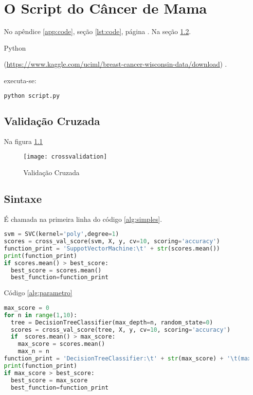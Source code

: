 \chapter{O Script do Câncer de Mama}
\label{chapter:o_script_do_cancer_de_mama}


No apêndice \ref{app:code}, seção
\ref{lst:code}, página \pageref{lst:code}.
Na seção \ref{sintaxe}.

Python \cite{PYTHON} 
  
(\url{https://www.kaggle.com/uciml/breast-cancer-wisconsin-data/download}) \cite{BREASTCANCER}.

executa-se:

\begin{lstlisting}[language=Python, caption=Executar Script.py]
python script.py
\end{lstlisting}

\section{Validação Cruzada}

Na figura \ref{fig:crossvalidation}

\begin{figure}[H]
\begin{center}
\caption{Validação Cruzada}
\texttt{[image: crossvalidation]}
\label{fig:crossvalidation}
\end{center}
\end{figure}

\section{Sintaxe}
\label{sintaxe}
É chamada na primeira linha do código \ref{alg:simples}.


\begin{lstlisting}[language=Python, caption=Sintaxe Simples, label=alg:simples]
svm = SVC(kernel='poly',degree=1)
scores = cross_val_score(svm, X, y, cv=10, scoring='accuracy')
function_print = 'SuppotVectorMachine:\t' + str(scores.mean())
print(function_print)
if scores.mean() > best_score:
  best_score = scores.mean()
  best_function=function_print
\end{lstlisting}

Código \ref{alg:parametro}

\begin{lstlisting}[language=Python, caption=Sintaxe com Parâmetro, label=alg:parametro]
max_score = 0
for n in range(1,10):
  tree = DecisionTreeClassifier(max_depth=n, random_state=0)
  scores = cross_val_score(tree, X, y, cv=10, scoring='accuracy')
  if  scores.mean() > max_score:
    max_score = scores.mean()
    max_n = n
function_print = 'DecisionTreeClassifier:\t' + str(max_score) + '\t(max_depth=' + str(max_n) + ')'
print(function_print)
if max_score > best_score:
  best_score = max_score
  best_function=function_print
\end{lstlisting}

